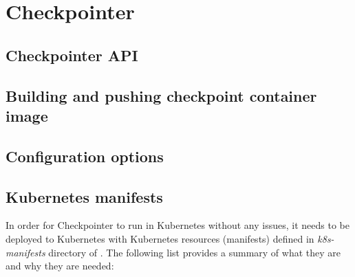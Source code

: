 \documentclass[
  digital,     %
  oneside,     %
  nosansbold,  %
  nocolorbold, %
  lof,         %
  lot,         %
]{fithesis4}
\begin{document}
\chapter{Checkpointer}
\label{chap:checkpointer}


\section{Checkpointer API}


\section{Building and pushing checkpoint container image}


\section{Configuration options}

\section{Kubernetes manifests}
In order for Checkpointer to run in Kubernetes without any issues, it needs to be deployed to Kubernetes with Kubernetes resources (manifests) defined in \emph{k8s-manifests} directory of . The following list provides a summary of what they are and why they are needed:
\end{document}
